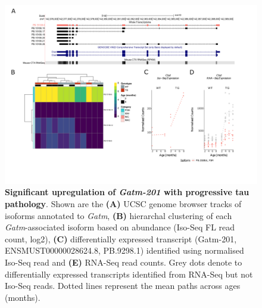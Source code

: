 \begin{landscape}
	\begin{figure}[!htp]
		\centering
		\includegraphics[page=3,trim={1.5cm 3.5cm 2cm 1cm}, scale = 0.85]{Figures/Ch5_DiffPlots_Landscape.pdf}
		\captionsetup{width=1.5\textwidth}
		\caption[Differential Isoform Expression: \textit{Gatm}]%
		{\textbf{Significant upregulation of \textit{Gatm-201} with progressive tau pathology}. Shown are the \textbf{(A)} UCSC genome browser tracks of isoforms annotated to \textit{Gatm}, \textbf{(B)} hierarchal clustering of each \textit{Gatm}-associated isoform based on abundance (Iso-Seq FL read count, log2), \textbf{(C)} differentially expressed transcript (Gatm-201, ENSMUST00000028624.8, PB.9298.1) identified using normalised Iso-Seq read and \textbf{(E)} RNA-Seq read counts. Grey dots denote to differentially expressed transcripts identified from RNA-Seq but not Iso-Seq reads. Dotted lines represent the mean paths across ages (months).}   
		\label{fig:Gatm}
	\end{figure}	
\end{landscape}

